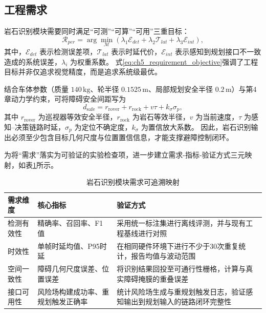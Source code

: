 \documentclass[UTF8,zihao=-4,a4paper,oneside,openany]{ctexrep}
\numberwithin{equation}{chapter}
\renewcommand{\small}{\normalsize}
\renewcommand{\small}{\normalsize}
\theoremstyle{plain}
\theoremstyle{definition}
\begin{document}
\subsection{工程需求}

岩石识别模块需要同时满足“可测”“可算”“可用”三重目标：
\begin{equation}
\mathcal{R}_{per}=\arg\min_{\mathcal{M}}
\left(
\lambda_1 \mathcal{E}_{det}+
\lambda_2 \mathcal{T}_{lat}+
\lambda_3 \mathcal{E}_{int}
\right),
\label{eq:ch5_requirement_objective}
\end{equation}
其中，$\mathcal{E}_{det}$ 表示检测误差项，$\mathcal{T}_{lat}$ 表示时延代价，$\mathcal{E}_{int}$ 表示感知到规划接口不一致造成的系统误差，$\lambda_i$ 为权重系数。
式\eqref{eq:ch5_requirement_objective}强调了工程目标并非仅追求视觉精度，而是追求系统级最优。

结合车体参数（质量 $140\,\mathrm{kg}$、轮半径 $0.1525\,\mathrm{m}$、局部规划安全半径 $0.2\,\mathrm{m}$）与第4章动力学约束，可将障碍安全间距写为
\begin{equation}
d_{\mathrm{safe}}=r_{\mathrm{rover}}+r_{\mathrm{rock}}+v\tau+k_\sigma \sigma_p,
\label{eq:ch5_safe_distance_base}
\end{equation}
其中 $r_{\mathrm{rover}}$ 为巡视器等效安全半径，$r_{\mathrm{rock}}$ 为岩石等效半径，$v$ 为当前速度，$\tau$ 为感知--决策链路时延，$\sigma_p$ 为定位不确定度，$k_\sigma$ 为置信放大系数。
因此，岩石识别输出必须至少包含目标几何尺度与位置置信信息，才能支撑避障控制闭环。

为将“需求”落实为可验证的实验检查项，进一步建立需求-指标-验证方式三元映射，如表\ref{tab:ch5_requirement_traceability}所示。

\begin{table}[H]
	\centering
	\small
	\caption{岩石识别模块需求可追溯映射}
	\label{tab:ch5_requirement_traceability}
	\begin{tabular}{p{}p{}p{}}
		\toprule
		需求维度 & 核心指标 & 验证方式 \\
		\midrule
		检测有效性 & 精确率、召回率、F1值 & 采用统一标注集进行离线评测，并与现有工程基线进行对照 \\
		时效性 & 单帧时延均值、P95时延 & 在相同硬件环境下进行不少于30次重复统计，报告均值与波动范围 \\
		空间一致性 & 障碍几何尺度误差、位置误差 & 将识别结果回投至可通行性栅格，计算与真实障碍掩膜的重叠误差 \\
		接口可用性 & 风险场构建成功率、重规划触发正确率 & 统计风险场生成与重规划触发日志，验证感知输出到规划输入的链路闭环完整性 \\
		\bottomrule
	\end{tabular}
\end{table}
\end{document}
